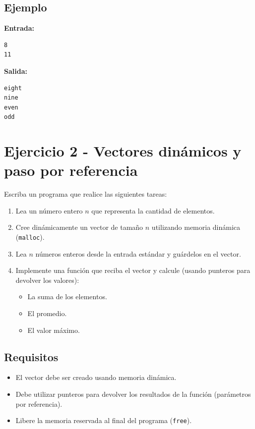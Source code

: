 \documentclass[12pt,a4paper]{article}
\begin{document}
\subsection*{Ejemplo}
\textbf{Entrada:}
\begin{lstlisting}[numbers=none]
8
11
\end{lstlisting}

\textbf{Salida:}
\begin{lstlisting}[numbers=none]
eight
nine
even
odd
\end{lstlisting}

\newpage

\section*{Ejercicio 2 - Vectores dinámicos y paso por referencia}

Escriba un programa que realice las siguientes tareas:
\begin{enumerate}
    \item Lea un número entero $n$ que representa la cantidad de elementos.
    \item Cree dinámicamente un vector de tamaño $n$ utilizando memoria dinámica (\texttt{malloc}).
    \item Lea $n$ números enteros desde la entrada estándar y guárdelos en el vector.
    \item Implemente una función que reciba el vector y calcule (usando punteros para devolver los valores):
    \begin{itemize}
        \item La suma de los elementos.
        \item El promedio.
        \item El valor máximo.
    \end{itemize}
\end{enumerate}

\subsection*{Requisitos}
\begin{itemize}
    \item El vector debe ser creado usando memoria dinámica.
    \item Debe utilizar punteros para devolver los resultados de la función (parámetros por referencia).
    \item Libere la memoria reservada al final del programa (\texttt{free}).
\end{itemize}
\end{document}
